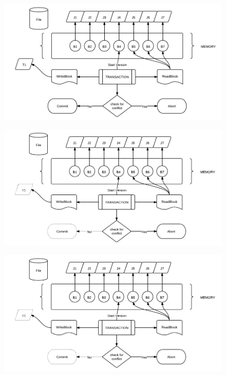 \documentclass[11pt,a4paper]{article}
\begin{document}
\begin{figure}[htb]
\centering
\includegraphics[angle=90]{1}
\end{figure}

\pagebreak

\begin{figure}[htb]
\centering
\includegraphics[angle=90]{2}
\end{figure}

\pagebreak

\begin{figure}[htb]
\centering
\includegraphics[angle=90]{2}
\end{figure}

\pagebreak
\end{document}
